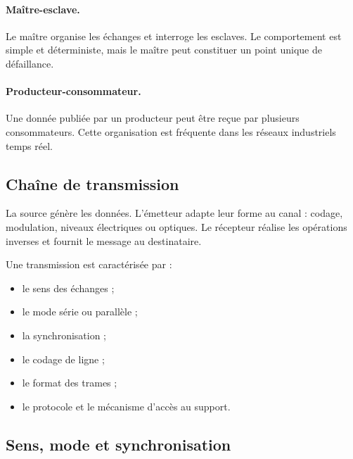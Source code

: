 \paragraph{Maître-esclave.}
Le maître organise les échanges et interroge les esclaves. Le comportement est simple et déterministe, mais le maître peut constituer un point unique de défaillance.

\paragraph{Producteur-consommateur.}
Une donnée publiée par un producteur peut être reçue par plusieurs consommateurs. Cette organisation est fréquente dans les réseaux industriels temps réel.

\subsection{Chaîne de transmission}

\begin{center}\TLChaineTransmission\end{center}

La source génère les données. L'émetteur adapte leur forme au canal : codage, modulation, niveaux électriques ou optiques. Le récepteur réalise les opérations inverses et fournit le message au destinataire.

Une transmission est caractérisée par :
\begin{itemize}
  \item le sens des échanges ;
  \item le mode série ou parallèle ;
  \item la synchronisation ;
  \item le codage de ligne ;
  \item le format des trames ;
  \item le protocole et le mécanisme d'accès au support.
\end{itemize}

\subsection{Sens, mode et synchronisation}

